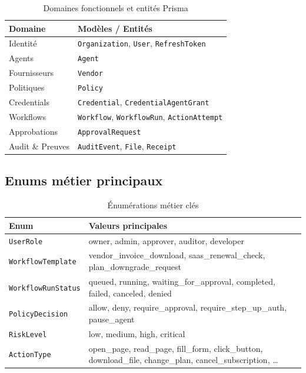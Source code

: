\begin{table}[H]
\centering
\caption{Domaines fonctionnels et entités Prisma}
\label{tab:domaines_bd}
\begin{tabularx}{\textwidth}{@{}p{2.4cm}X@{}}
\toprule
\textbf{Domaine}  & \textbf{Modèles / Entités} \\
\midrule
\rowcolor{rowgray}
Identité          & \texttt{Organization}, \texttt{User}, \texttt{RefreshToken} \\
Agents            & \texttt{Agent} \\
\rowcolor{rowgray}
Fournisseurs      & \texttt{Vendor} \\
Politiques        & \texttt{Policy} \\
\rowcolor{rowgray}
Credentials       & \texttt{Credential}, \texttt{CredentialAgentGrant} \\
Workflows         & \texttt{Workflow}, \texttt{WorkflowRun}, \texttt{ActionAttempt} \\
\rowcolor{rowgray}
Approbations      & \texttt{ApprovalRequest} \\
Audit \& Preuves  & \texttt{AuditEvent}, \texttt{File}, \texttt{Receipt} \\
\bottomrule
\end{tabularx}
\end{table}

\subsection{Enums métier principaux}

\begin{table}[H]
\centering
\caption{Énumérations métier clés}
\label{tab:enums}
\small
\begin{tabularx}{\textwidth}{@{}p{3.2cm}X@{}}
\toprule
\textbf{Enum} & \textbf{Valeurs principales} \\
\midrule
\rowcolor{rowgray}
\texttt{UserRole} & owner, admin, approver, auditor, developer \\
\texttt{WorkflowTemplate} & vendor\_invoice\_download, saas\_renewal\_check,
  plan\_downgrade\_request \\
\rowcolor{rowgray}
\texttt{WorkflowRunStatus} & queued, running, waiting\_for\_approval,
  completed, failed, canceled, denied \\
\texttt{PolicyDecision} & allow, deny, require\_approval,
  require\_step\_up\_auth, pause\_agent \\
\rowcolor{rowgray}
\texttt{RiskLevel} & low, medium, high, critical \\
\texttt{ActionType} & open\_page, read\_page, fill\_form, click\_button,
  download\_file, change\_plan, cancel\_subscription, \ldots \\
\bottomrule
\end{tabularx}
\end{table}

